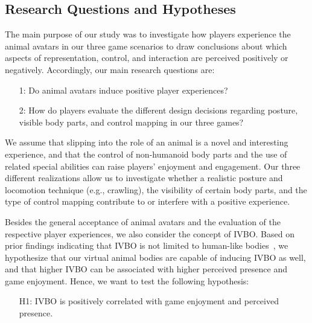 \documentclass{sigchi}
\begin{document}
\subsection{Research Questions and Hypotheses} %
The main purpose of our study was to investigate how players experience the animal avatars in our three game scenarios to draw conclusions about which aspects of representation, control, and interaction are perceived positively or negatively. Accordingly, our main research questions are: 
\begin{enumerate}[leftmargin=1cm]
\item[1:] Do animal avatars induce positive player experiences?
\item[2:] How do players evaluate the different design decisions regarding posture, visible body parts, and control mapping in our three games? %
\end{enumerate}

We assume that slipping into the role of an animal is a novel and interesting experience, and that the control of non-humanoid body parts and the use of related special abilities can raise players' enjoyment and engagement. Our three different realizations allow us to investigate whether a realistic posture and locomotion technique (e.g., crawling), the visibility of certain body parts, and the type of control mapping contribute to or interfere with a positive experience.  


Besides the general acceptance of animal avatars and the evaluation of the respective player experiences, we also consider the concept of IVBO. 
Based on prior findings indicating that IVBO is not limited to human-like bodies~\cite{won2015homuncular,krekhov2018anim},  %
we hypothesize that our virtual animal bodies are capable of inducing IVBO as well, and that higher IVBO can be associated with higher perceived presence and game enjoyment. Hence, we want to test the following hypothesis: 

\begin{enumerate} [leftmargin=1cm]
\item[H1:] IVBO is positively correlated with game enjoyment and perceived presence. 
\end{enumerate}
\end{document}
